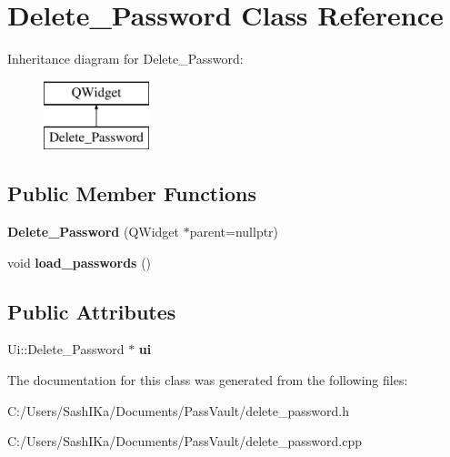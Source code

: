 \hypertarget{class_delete___password}{}\section{Delete\+\_\+\+Password Class Reference}
\label{class_delete___password}
Inheritance diagram for Delete\+\_\+\+Password\+:\begin{figure}[H]
\begin{center}
\leavevmode
\includegraphics[height=2.000000cm]{class_delete___password}
\end{center}
\end{figure}
\subsection*{Public Member Functions}
\begin{DoxyCompactItemize}
\item 
\mbox{\label{class_delete___password_ac3c695161014f009f927e370735fe668}} 
{\bfseries Delete\+\_\+\+Password} (Q\+Widget $\ast$parent=nullptr)
\item 
\mbox{\label{class_delete___password_a3081cbb0fe16119665f74db3cad9a9f9}} 
void {\bfseries load\+\_\+passwords} ()
\end{DoxyCompactItemize}
\subsection*{Public Attributes}
\begin{DoxyCompactItemize}
\item 
\mbox{\label{class_delete___password_a2d34e703ec5f9b84e12b257be8a8bbf1}} 
Ui\+::\+Delete\+\_\+\+Password $\ast$ {\bfseries ui}
\end{DoxyCompactItemize}


The documentation for this class was generated from the following files\+:\begin{DoxyCompactItemize}
\item 
C\+:/\+Users/\+Sash\+I\+Ka/\+Documents/\+Pass\+Vault/delete\+\_\+password.\+h\item 
C\+:/\+Users/\+Sash\+I\+Ka/\+Documents/\+Pass\+Vault/delete\+\_\+password.\+cpp\end{DoxyCompactItemize}
